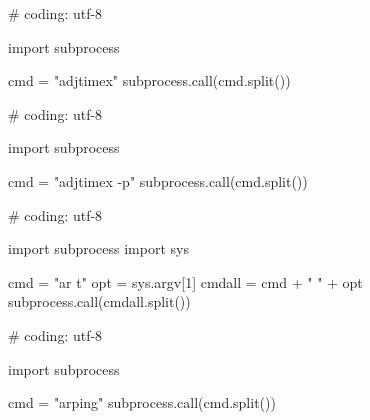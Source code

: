 \begin{mylisting}[label={lst:acpid},language=sh,caption=adjtimex]
# coding: utf-8

import subprocess

cmd = "adjtimex"
subprocess.call(cmd.split())

\end{mylisting}


\begin{mylisting}[label={lst:acpid},language=sh,caption=adjtimex -p]
# coding: utf-8

import subprocess

cmd = "adjtimex -p"
subprocess.call(cmd.split())

\end{mylisting}


\begin{mylisting}[label={lst:acpid},language=sh,caption=ar]
# coding: utf-8

import subprocess
import sys

cmd = "ar t"
opt = sys.argv[1]
cmdall = cmd + " " + opt
subprocess.call(cmdall.split())

\end{mylisting}

\begin{mylisting}[label={lst:acpid},language=sh,caption=arp]
# coding: utf-8

import subprocess

cmd = "arping"
subprocess.call(cmd.split())

\end{mylisting}

